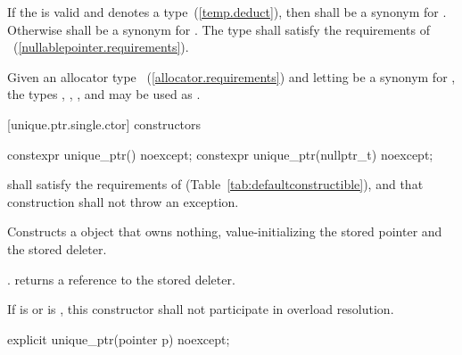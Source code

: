 \pnum
If the   is valid and denotes a
type~(\ref{temp.deduct}), then  shall be a synonym for . Otherwise
 shall be a synonym for . The type  shall
satisfy the requirements of ~(\ref{nullablepointer.requirements}).

\pnum
\begin{example} Given an allocator type ~(\ref{allocator.requirements}) and
letting  be a synonym for , the types ,
, , and 
may be used as . \end{example}

[unique.ptr.single.ctor]{ constructors}

%
\begin{itemdecl}
constexpr unique_ptr() noexcept;
constexpr unique_ptr(nullptr_t) noexcept;
\end{itemdecl}

\begin{itemdescr}
\pnum
\requires {} shall
satisfy the requirements of  (Table~\ref{tab:defaultconstructible}),
and that construction shall not throw an exception.

\pnum
\effects Constructs a  object that owns
nothing, value-initializing the stored pointer and the stored deleter.

\pnum
\postconditions {}. 
returns a reference to the stored deleter.

\pnum
\remarks If  is  or
 is ,
this constructor shall not participate in overload resolution.
\end{itemdescr}

%
\begin{itemdecl}
explicit unique_ptr(pointer p) noexcept;
\end{itemdecl}

